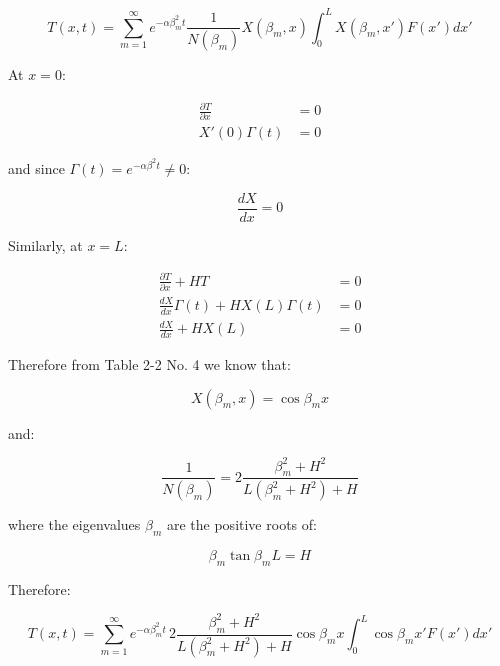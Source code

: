 \documentclass[letterpaper,12pt]{article}
\begin{document}
\begin{equation}
    T(x, t) = \sum_{m=1}^{{\infty}} e ^{- \alpha \beta^{2}_m t} \frac{1}{N \left( \beta_m\right)} X\left( \beta_m , x\right) \int_{0}^{L} X\left(\beta_m , x'\right) F(x') dx'
\end{equation}

At $x = 0$:

\begin{equation}
\begin{aligned}
    \frac{\partial T}{\partial x} &= 0 \\
    X'(0)\Gamma(t) &= 0
\end{aligned}
\end{equation}

and since $\Gamma(t) = e^{- \alpha \beta^2 t} \neq 0$:

\begin{equation}
    \frac{dX}{dx} = 0
\end{equation}

Similarly, at $x = L$:

\begin{equation}
\begin{aligned}
    \frac{\partial T}{\partial x} + HT       &= 0 \\
    \frac{dX}{dx} \Gamma(t) + HX(L)\Gamma(t) &= 0 \\
    \frac{dX}{dx} + HX(L)                    &= 0
\end{aligned}
\end{equation}

Therefore from Table 2-2 No. 4 we know that:

\begin{equation}
    X\left(\beta_m, x\right) = \cos{\beta_m x}
\end{equation}

and:

\begin{equation}
    \frac{1}{N\left(\beta_m\right)} = 2 \frac{\beta^{2}_m + H^2}{L\left(\beta^{2}_m + H^2 \right) + H}
\end{equation}

where the eigenvalues $\beta_m$ are the positive roots of:

\begin{equation}
    \beta_m \tan{\beta_m L} = H
\end{equation}

Therefore:

\begin{equation}
\boxed{
    T(x, t) = \sum_{m=1}^{{\infty}} e ^{- \alpha \beta^{2}_m t} \, 2 \frac{\beta^{2}_m + H^2}{L\left(\beta^{2}_m + H^2 \right) + H} \cos{\beta_m x} \int_{0}^{L} \cos{\beta_m x'} F(x') dx'
}
\end{equation}
\end{document}
